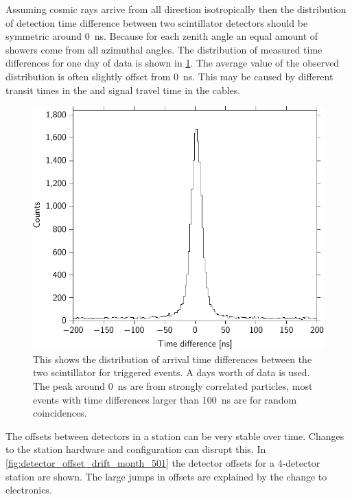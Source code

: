 Assuming cosmic rays arrive from all direction isotropically then the distribution of detection time difference between two scintillator detectors should be symmetric around \SI{0}{\ns}. Because for each zenith angle an equal amount of showers come from all azimuthal angles. The distribution of measured time differences for one day of data is shown in \cref{fig:detector_time_difference_distribution}. The average value of the observed distribution is often slightly offset from \SI{0}{\ns}. This may be caused by different transit times in the \pmt and signal travel time in the cables.

\begin{figure}
    \centering
    \includegraphics{plots/station/detector_time_difference_distribution}
    \caption{This shows the distribution of arrival time differences between the two scintillator for triggered events. A days worth of data is used. The peak around \SI{0}{\ns} are from strongly correlated particles, most events with time differences larger than \SI{100}{\ns} are for random coincidences.}
    \label{fig:detector_time_difference_distribution}
\end{figure}

The offsets between detectors in a station can be very stable over time. Changes to the station hardware and configuration can disrupt this. In \cref{fig:detector_offset_drift_month_501} the detector offsets for a 4-detector station are shown. The large jumps in offsets are explained by the change to \hisparciii electronics.

